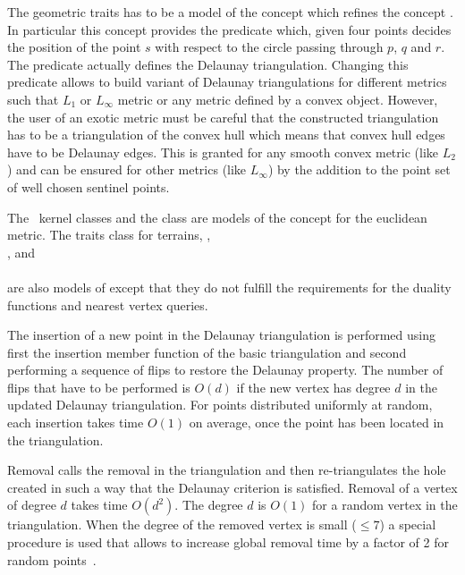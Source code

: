 The geometric traits has to be a model of the concept
which refines the concept .
In particular this concept provides
the  predicate
which, given four points 
 decides the position of  the point $s$  with respect to the circle
passing through $p$, $q$ and $r$. 
The 
predicate actually defines the Delaunay triangulation.
Changing this predicate 
allows to build variant of Delaunay triangulations for different metrics
such that $L_1$ or $L_{\infty}$ metric or any metric defined by a
convex object. However, the user of an exotic metric
must be careful that the constructed triangulation 
has to be a triangulation of the convex hull
which means that convex hull edges have to be Delaunay edges.
This is granted for any smooth convex metric (like $L_2$)
and can be ensured for other metrics (like  $L_{\infty}$)
by the addition to the point set of well chosen sentinel points.

The \cgal\  kernel classes 
 and the class 
are models of the concept 
for the euclidean metric.
The traits class for terrains,
,\\
, and\\
 \\
are also models of  
except that they do not fulfill
the requirements for the duality functions and nearest vertex
queries.

The insertion of a new point in the Delaunay triangulation
is performed using first the insertion member function
of the basic triangulation and second 
performing a sequence of flips to restore the Delaunay property. 
The number of flips that have to be performed is $O(d)$
if the new vertex has degree $d$ in the updated
Delaunay triangulation. For
points distributed uniformly at random, 
each insertion takes time $O(1)$ on
average, once the point has been located in the triangulation.

Removal calls the removal in the triangulation and then re-triangulates
the hole created in such a way that  the Delaunay criterion is
satisfied. Removal of a
vertex of degree $d$ takes time $O(d^2)$.
The degree $d$ is $O(1)$ for a random
vertex in the triangulation.
When the degree of the removed vertex is small ($\leq7$) a special
procedure is used that allows to increase global removal time by a factor of 2
for random points~\cite{d-vrtdd-09}.

